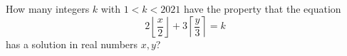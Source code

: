 How many integers $k$ with $1<k<2021$ have the property that the equation
\[2\left\lfloor\dfrac x2\right\rfloor+3\left\lceil\dfrac y3\right\rceil=k\]
has a solution in real numbers $x,y$?
